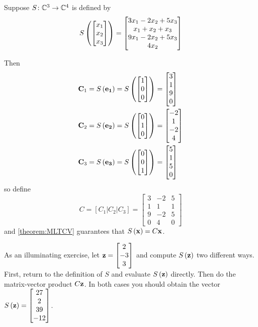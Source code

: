 \documentclass{ximera}
\begin{document}
\begin{example}

Suppose $S\colon \mathbb{C}^{3}\rightarrow\mathbb{C}^{4}$ is defined by
\[
S\left(\begin{bmatrix}x_1\\x_2\\x_3\end{bmatrix}\right)=\begin{bmatrix}3x_1-2x_2+5x_3\\x_1+x_2+x_3\\9x_1-2x_2+5x_3\\4x_2\end{bmatrix}
\]




Then
\begin{align*}
\mathbf{C}_1&=S\left(\mathbf{e_1}\right)=S\left(\begin{bmatrix}1\\0\\0\end{bmatrix}\right)=\begin{bmatrix}3\\1\\9\\0\end{bmatrix}\\
\mathbf{C}_2&=S\left(\mathbf{e_2}\right)=S\left(\begin{bmatrix}0\\1\\0\end{bmatrix}\right)=\begin{bmatrix}-2\\1\\-2\\4\end{bmatrix}\\
\mathbf{C}_3&=S\left(\mathbf{e_3}\right)=S\left(\begin{bmatrix}0\\0\\1\end{bmatrix}\right)=\begin{bmatrix}5\\1\\5\\0\end{bmatrix}
\end{align*}
so define
\[
C=\left[C_1|C_2|C_3\right]=
\begin{bmatrix}
3&-2&5\\
1&1&1\\
9&-2&5\\
0&4&0
\end{bmatrix}
\]
and \ref{theorem:MLTCV} guarantees that $S\left(\mathbf{x}\right)=C\mathbf{x}$.

As an illuminating exercise, let $\mathbf{z}=\begin{bmatrix}2\\-3\\3\end{bmatrix}$ and compute $S\left(\mathbf{z}\right)$ two different ways.  First, return to the definition of $S$ and evaluate $S\left(\mathbf{z}\right)$ directly.  Then do the matrix-vector product $C\mathbf{z}$.  In both cases you should obtain the vector $S\left(\mathbf{z}\right)=\begin{bmatrix}27\\2\\39\\-12\end{bmatrix}$.

\end{example}
\end{document}

